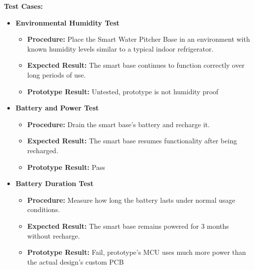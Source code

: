 \noindent{}\textbf{Test Cases:}
\begin{itemize}
\setlength{\itemsep}{0pt}
\setlength{\parskip}{0pt}
\setlength{\parsep}{0pt}
\setlength{\topsep}{0pt}

\item \textbf{Environmental Humidity Test}
\begin{itemize}
\item \textbf{Procedure:} Place the Smart Water Pitcher Base in an environment with known humidity levels similar to a typical indoor refrigerator.
\item \textbf{Expected Result:} The smart base continues to function correctly over long periods of use.
\item \textbf{Prototype Result:} Untested, prototype is not humidity proof
\end{itemize}

\item \textbf{Battery and Power Test}
\begin{itemize}
\item \textbf{Procedure:} Drain the smart base's battery and recharge it.
\item \textbf{Expected Result:} The smart base resumes functionality after being recharged.
\item \textbf{Prototype Result:} Pass
\end{itemize}

\item \textbf{Battery Duration Test}
\begin{itemize}
\item \textbf{Procedure:} Measure how long the battery lasts under normal usage conditions.
\item \textbf{Expected Result:} The smart base remains powered for 3 months without recharge.
\item \textbf{Prototype Result:} Fail, prototype's MCU uses much more power than the actual design's custom PCB
\end{itemize}

\end{itemize}